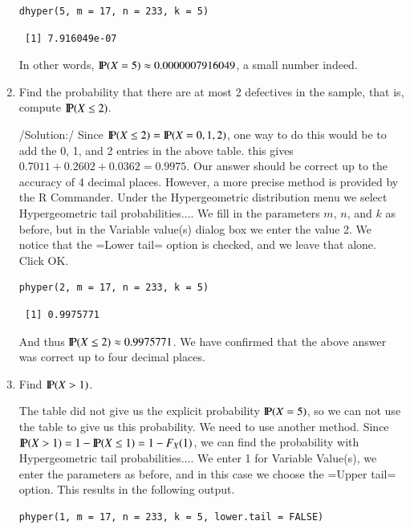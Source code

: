 \documentclass[captions=tableheading]{scrbook}
\begin{document}
\begin{enumerate}
\begin{verbatim}
dhyper(5, m = 17, n = 233, k = 5)
\end{verbatim}

\begin{verbatim}
 [1] 7.916049e-07
\end{verbatim}

In other words, \(\P(X=5)\approx0.0000007916049\), a small number indeed.

\item Find the probability that there are at most 2 defectives in the sample, that is, compute \(\P(X\leq2)\).

/Solution:/ Since \(\P(X\leq2)=\P(X=0,1,2)\), one way to do this would be to add the 0, 1, and 2 entries in the above table. this gives \(0.7011+0.2602+0.0362=0.9975\). Our answer should be correct up to the accuracy of 4 decimal places. However, a more precise method is provided by the \textsf{R} Commander. Under the \textsf{Hypergeometric distribution} menu we select \textsf{Hypergeometric tail probabilities}.... We fill in the parameters \(m\), \(n\), and \(k\) as before, but in the \textsf{Variable value(s)} dialog box we enter the value 2. We notice that the =Lower tail= option is checked, and we leave that alone. Click \textsf{OK}.


\begin{verbatim}
phyper(2, m = 17, n = 233, k = 5)
\end{verbatim}

\begin{verbatim}
 [1] 0.9975771
\end{verbatim}

And thus \(\P(X\leq2)\approx 0.9975771\). We have confirmed that the above answer was correct up to four decimal places.

\item Find \(\P(X>1)\). 

The table did not give us the explicit probability \(\P(X=5)\), so we can not use the table to give us this probability. We need to use another method. Since \(\P(X>1)=1-\P(X\leq1)=1-F_{X}(1)\), we can find the probability with \textsf{Hypergeometric tail probabilities}.... We enter 1 for \textsf{Variable Value(s)}, we enter the parameters as before, and in this case we choose the =Upper tail= option. This results in the following output.


\begin{verbatim}
phyper(1, m = 17, n = 233, k = 5, lower.tail = FALSE)
\end{verbatim}


\end{enumerate}
\end{document}
